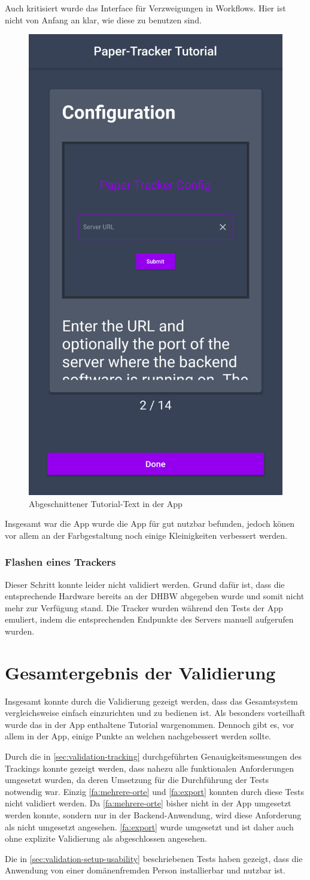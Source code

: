 Auch kritisiert wurde das Interface für Verzweigungen in Workflows. Hier ist nicht von Anfang an
klar, wie diese zu benutzen sind.

\begin{figure}[htbp]
	\centering
	\includegraphics[width=.3\textwidth]{images/screenshot_app_tutorial_feedback.png}
	\caption{Abgeschnittener Tutorial-Text in der App}
	\label{fig:tutorial-feedback}
\end{figure}

Insgesamt war die App wurde die App für gut nutzbar befunden, jedoch könen vor allem an der
Farbgestaltung noch einige Kleinigkeiten verbessert werden.

\subsubsection{Flashen eines Trackers}

Dieser Schritt konnte leider nicht validiert werden. Grund dafür ist, dass die entsprechende
Hardware bereits an der \gls{DHBW} abgegeben wurde und somit nicht mehr zur Verfügung stand.
Die Tracker wurden während den Tests der App emuliert, indem die entsprechenden Endpunkte des Servers
manuell aufgerufen wurden.

\section{Gesamtergebnis der Validierung}

Insgesamt konnte durch die Validierung gezeigt werden, dass das Gesamtsystem vergleichsweise einfach
einzurichten und zu bedienen ist. Als besonders vorteilhaft wurde das in der App enthaltene Tutorial
wargenommen. Dennoch gibt es, vor allem in der App, einige Punkte an welchen nachgebessert werden
sollte.

Durch die in \autoref{sec:validation-tracking} durchgeführten Genauigkeitsmessungen des Trackings
konnte gezeigt werden, dass nahezu alle funktionalen Anforderungen umgesetzt wurden, da deren
Umsetzung für die Durchführung der Tests notwendig war. Einzig \ref{fa:mehrere-orte} und
\ref{fa:export} konnten durch diese Tests nicht validiert werden. Da \ref{fa:mehrere-orte} bisher
nicht in der App umgesetzt werden konnte, sondern nur in der Backend-Anwendung, wird diese
Anforderung als nicht umgesetzt angesehen. \ref{fa:export} wurde umgesetzt und ist daher auch ohne
explizite Validierung als abgeschlossen angesehen.

Die in \autoref{sec:validation-setup-usability} beschriebenen Tests haben gezeigt, dass die
Anwendung von einer domänenfremden Person installierbar und nutzbar ist.
